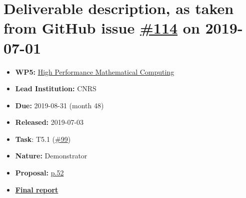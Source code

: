 \section*{\texorpdfstring{Deliverable description, as taken from GitHub
issue
\href{https://github.com/OpenDreamKit/OpenDreamKit/issues/114}{\#114} on
2019-07-01}{Deliverable description, as taken from GitHub issue \#114 on 2019-07-01}}\label{deliverable-description-as-taken-from-github-issues-114-on-2019-07-01}

\begin{itemize}
\tightlist
\item
  \textbf{WP5:}
  \href{https://github.com/OpenDreamKit/OpenDreamKit/tree/master/WP5}{High
  Performance Mathematical Computing}
\item
  \textbf{Lead Institution:} CNRS
\item
  \textbf{Due:} 2019-08-31 (month 48)
\item
  \textbf{Released:} 2019-07-03
\item
  \textbf{Task}: T5.1
  (\href{https://github.com/OpenDreamKit/OpenDreamKit/issues/99}{\#99})
\item
  \textbf{Nature:} Demonstrator
\item
  \textbf{Proposal:}
  \href{https://github.com/OpenDreamKit/OpenDreamKit/raw/master/Proposal/proposal-www.pdf}{p.52}
\item
  \textbf{\href{https://github.com/OpenDreamKit/OpenDreamKit/raw/master/WP5/D5.16/report-final.pdf}{Final report}}
\end{itemize}

